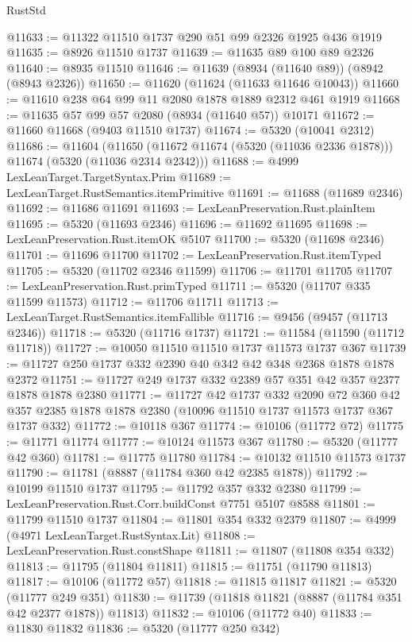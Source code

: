 \begin{lexlean}{RustStd}
\begin{coremodule}
@11633 := @11322 @11510 @1737 @290 @51 @99 @2326 @1925 @436 @1919
@11635 := @8926 @11510 @1737
@11639 := @11635 @89 @100 @89 @2326
@11640 := @8935 @11510
@11646 := @11639 (@8934 (@11640 @89)) (@8942 (@8943 @2326))
@11650 := @11620 (@11624 (@11633 @11646 @10043))
@11660 := @11610 @238 @64 @99 @11 @2080 @1878 @1889 @2312 @461 @1919
@11668 := @11635 @57 @99 @57 @2080 (@8934 (@11640 @57)) @10171
@11672 := @11660 @11668 (@9403 @11510 @1737)
@11674 := @5320 (@10041 @2312)
@11686 := @11604
    (@11650 (@11672 @11674 (@5320 (@11036 @2336 @1878))) @11674 (@5320 (@11036 @2314 @2342)))
@11688 := @4999 LexLeanTarget.TargetSyntax.Prim
@11689 := LexLeanTarget.RustSemantics.itemPrimitive
@11691 := @11688 (@11689 @2346)
@11692 := @11686 @11691
@11693 := LexLeanPreservation.Rust.plainItem
@11695 := @5320 (@11693 @2346)
@11696 := @11692 @11695
@11698 := LexLeanPreservation.Rust.itemOK @5107
@11700 := @5320 (@11698 @2346)
@11701 := @11696 @11700
@11702 := LexLeanPreservation.Rust.itemTyped
@11705 := @5320 (@11702 @2346 @11599)
@11706 := @11701 @11705
@11707 := LexLeanPreservation.Rust.primTyped
@11711 := @5320 (@11707 @335 @11599 @11573)
@11712 := @11706 @11711
@11713 := LexLeanTarget.RustSemantics.itemFallible
@11716 := @9456 (@9457 (@11713 @2346))
@11718 := @5320 (@11716 @1737)
@11721 := @11584 (@11590 (@11712 @11718))
@11727 := @10050 @11510 @11510 @1737 @11573 @1737 @367
@11739 := @11727 @250 @1737 @332 @2390 @40 @342 @42 @348 @2368 @1878 @1878 @2372
@11751 := @11727 @249 @1737 @332 @2389 @57 @351 @42 @357 @2377 @1878 @1878 @2380
@11771 := @11727
    @42
    @1737
    @332
    @2090
    @72
    @360
    @42
    @357
    @2385
    @1878
    @1878
    @2380
    (@10096 @11510 @1737 @11573 @1737 @367 @1737 @332)
@11772 := @10118 @367
@11774 := @10106 (@11772 @72)
@11775 := @11771 @11774
@11777 := @10124 @11573 @367
@11780 := @5320 (@11777 @42 @360)
@11781 := @11775 @11780
@11784 := @10132 @11510 @11573 @1737
@11790 := @11781 (@8887 (@11784 @360 @42 @2385 @1878))
@11792 := @10199 @11510 @1737
@11795 := @11792 @357 @332 @2380
@11799 := LexLeanPreservation.Rust.Corr.buildConst @7751 @5107 @8588
@11801 := @11799 @11510 @1737
@11804 := @11801 @354 @332 @2379
@11807 := @4999 (@4971 LexLeanTarget.RustSyntax.Lit)
@11808 := LexLeanPreservation.Rust.constShape
@11811 := @11807 (@11808 @354 @332)
@11813 := @11795 (@11804 @11811)
@11815 := @11751 (@11790 @11813)
@11817 := @10106 (@11772 @57)
@11818 := @11815 @11817
@11821 := @5320 (@11777 @249 @351)
@11830 := @11739 (@11818 @11821 (@8887 (@11784 @351 @42 @2377 @1878)) @11813)
@11832 := @10106 (@11772 @40)
@11833 := @11830 @11832
@11836 := @5320 (@11777 @250 @342)

\end{coremodule}
\end{lexlean}
